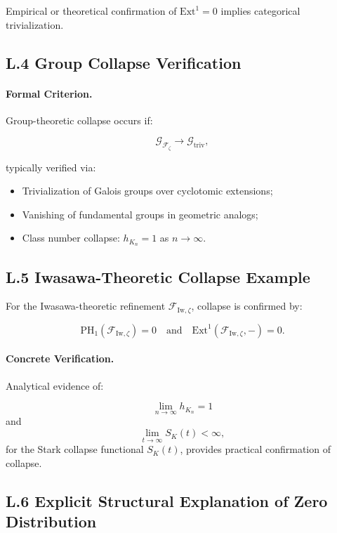 \documentclass[11pt]{article}
\begin{document}
Empirical or theoretical confirmation of $\mathrm{Ext}^1 = 0$ implies categorical trivialization.

\subsection*{L.4 Group Collapse Verification}

\paragraph{Formal Criterion.}  
Group-theoretic collapse occurs if:

\[
\mathcal{G}_{\mathcal{F}_{\zeta}} \longrightarrow \mathcal{G}_{\mathrm{triv}},
\]

typically verified via:

\begin{itemize}
    \item Trivialization of Galois groups over cyclotomic extensions;
    \item Vanishing of fundamental groups in geometric analogs;
    \item Class number collapse: $h_{K_n} = 1$ as $n \to \infty$.
\end{itemize}

\subsection*{L.5 Iwasawa-Theoretic Collapse Example}

For the Iwasawa-theoretic refinement $\mathcal{F}_{\mathrm{Iw}, \zeta}$, collapse is confirmed by:

\[
\mathrm{PH}_1(\mathcal{F}_{\mathrm{Iw}, \zeta}) = 0 \quad \text{and} \quad \mathrm{Ext}^1(\mathcal{F}_{\mathrm{Iw}, \zeta}, -) = 0.
\]

\paragraph{Concrete Verification.}  
Analytical evidence of:

\[
\lim_{n \to \infty} h_{K_n} = 1
\]
and
\[
\lim_{t \to \infty} S_K(t) < \infty,
\]
for the Stark collapse functional $S_K(t)$, provides practical confirmation of collapse.

\subsection*{L.6 Explicit Structural Explanation of Zero Distribution}
\end{document}
